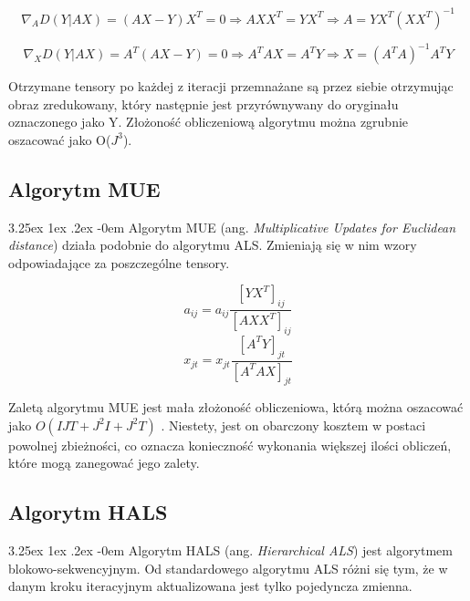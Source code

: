 \documentclass[11pt, a4paper]{article}
\makeatletter
\newcommand{\fbi}{\leavevmode{\parindent=1em\indent}}
\renewcommand\paragraph{\@startsection{paragraph}{5}{\z@}
  {3.25ex \@plus1ex \@minus.2ex}
  {-0em}
  {\normalfont\normalsize\bfseries}}
\makeatother
\begin{document}
\begin{equation}\label{eq:als1}
\nabla_A D(Y|AX) = (AX - Y)X^T = 0 \Rightarrow AXX^T = YX^T \Rightarrow A = YX^T(XX^T)^{-1}
\end{equation}

\begin{equation}\label{eq:als2}
\nabla_X D(Y|AX) = A^T(AX - Y) = 0 \Rightarrow A^TAX = A^TY \Rightarrow X = (A^TA)^{-1}A^TY
\end{equation}

\fbi
Otrzymane tensory po każdej z iteracji przemnażane są przez siebie otrzymując obraz zredukowany, który następnie jest przyrównywany do oryginału oznaczonego jako Y. Złożoność obliczeniową algorytmu można zgrubnie oszacować jako O($ J^3 $).

\subsection{Algorytm MUE}
\paragraph{}
Algorytm MUE (ang. \textit{Multiplicative Updates for Euclidean distance}) działa podobnie do algorytmu ALS. Zmieniają się w nim wzory odpowiadające za poszczególne tensory.

\begin{equation}\label{eq:mue1}
a_{ij} = a_{ij}\frac{[YX^T]_{ij}}{[AXX^T]_{ij}}
\end{equation}
\begin{equation}\label{eq:mue2}
x_{jt} = x_{jt}\frac{[A^TY]_{jt}}{[A^TAX]_{jt}}
\end{equation}

\fbi
Zaletą algorytmu MUE jest mała złożoność obliczeniowa, którą można oszacować jako $ O(IJT + J^2I + J^2T) $ . Niestety, jest on obarczony kosztem w postaci powolnej zbieżności, co oznacza konieczność wykonania większej ilości obliczeń, które mogą zanegować jego zalety.

\subsection{Algorytm HALS}
\paragraph{}
Algorytm HALS (ang. \textit{Hierarchical ALS}) jest algorytmem blokowo-sekwencyjnym. Od standardowego algorytmu ALS różni się tym, że w danym kroku iteracyjnym aktualizowana jest tylko pojedyncza zmienna.
\end{document}
